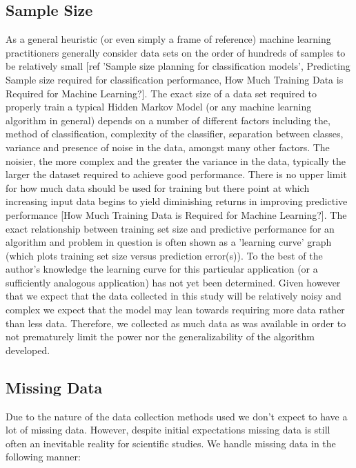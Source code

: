 \documentclass[]{article}
\begin{document}
\subsection{Sample Size} %

As a general heuristic (or even simply a frame of reference) machine learning practitioners generally consider data sets on the order of hundreds of samples to be relatively small [ref 'Sample size planning for classification models', Predicting Sample size required for classification performance, How Much Training Data is Required for Machine Learning?]. The exact size of a data set required to properly train a typical Hidden Markov Model (or any machine learning algorithm in general) depends on a number of different factors including the, method of classification, complexity of the classifier, separation between classes, variance and presence of noise in the data, amongst many other factors. The noisier, the more complex and the greater the variance in the data, typically the larger the dataset required to achieve good performance. There is no upper limit for how much data should be used for training but there point at which increasing input data begins to yield diminishing returns in improving predictive performance [How Much Training Data is Required for Machine Learning?]. The exact relationship between training set size and predictive performance for an algorithm and problem in question is often shown as a 'learning curve' graph (which plots training set size versus prediction error(s)). To the best of the author's knowledge the learning curve for this particular application (or a sufficiently analogous application) has not yet been determined. Given however that we expect that the data collected in this study will be relatively noisy and complex we expect that the model may lean towards requiring more data rather than less data. Therefore, we collected as much data as was available in order to not prematurely limit the power nor the generalizability of the algorithm developed.

\subsection{Missing Data} %

Due to the nature of the data collection methods used we don't expect to have a lot of missing data. However, despite initial expectations missing data is still often an inevitable reality for scientific studies. We handle missing data in the following manner:
\end{document}
